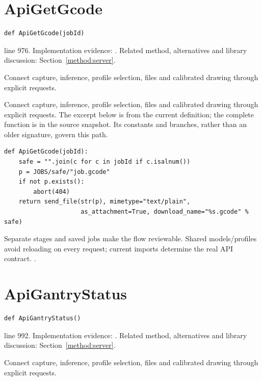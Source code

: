 \section{ApiGetGcode}\label{fn:web-server:ApiGetGcode}
\begin{lstlisting}[style=sig]
def ApiGetGcode(jobId)
\end{lstlisting}
 line 976. Implementation evidence: \cite{code2026}. Related method, alternatives and library discussion: Section~\ref{method:server}.


Connect capture, inference, profile selection, files and calibrated drawing through explicit requests.


Connect capture, inference, profile selection, files and calibrated drawing through explicit requests. The excerpt below is from the current definition; the complete function is in the source snapshot. Its constants and branches, rather than an older signature, govern this path.


\begin{lstlisting}[style=plain]
def ApiGetGcode(jobId):
    safe = "".join(c for c in jobId if c.isalnum())
    p = JOBS/safe/"job.gcode"
    if not p.exists():
        abort(404)
    return send_file(str(p), mimetype="text/plain",
                     as_attachment=True, download_name="%s.gcode" % safe)
\end{lstlisting}
Separate stages and saved jobs make the flow reviewable. Shared models/profiles avoid reloading on every request; current imports determine the real API contract. \cite{flaskdocs,pillowops,code2026}.


\section{ApiGantryStatus}\label{fn:web-server:ApiGantryStatus}
\begin{lstlisting}[style=sig]
def ApiGantryStatus()
\end{lstlisting}
 line 992. Implementation evidence: \cite{code2026}. Related method, alternatives and library discussion: Section~\ref{method:server}.


Connect capture, inference, profile selection, files and calibrated drawing through explicit requests.


